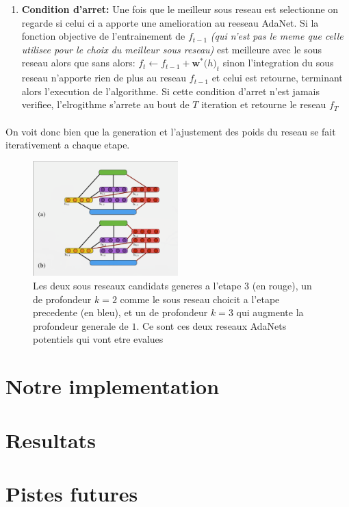 \documentclass[11 pt]{article}
\begin{document}
\begin{enumerate}
	\item \textbf{Condition d'arret: }Une fois que le meilleur sous reseau est selectionne on regarde si celui ci a apporte une amelioration au reeseau AdaNet. Si la fonction objective de l'entrainement de $f_{t-1}$ \emph{(qui n'est pas le meme que celle utilisee pour le choix du meilleur sous reseau)} est meilleure avec le sous reseau alors que sans alors: $f_t \leftarrow f_{t-1}+\mathbf{w}^*\mathbf(h)_t$ sinon l'integration du sous reseau n'apporte rien de plus au reseau $f_{t-1}$ et celui est retourne, terminant alors l'execution de l'algorithme. Si cette condition d'arret n'est jamais verifiee, l'elrogithme s'arrete au bout de $T$ iteration et retourne le reseau $f_T$
\end{enumerate}
\paragraph{}On voit donc bien que la generation et l'ajustement des poids du reseau se fait iterativement a chaque etape.\\ \bigskip
\begin{figure}[h]
	\centering
	\includegraphics[width=0.5\textwidth]{schema.png}
	\caption{Les deux sous reseaux candidats generes a l'etape $3$ (en rouge), un de profondeur $k=2$ comme le sous reseau choicit a l'etape precedente (en bleu), et un de profondeur $k=3$ qui augmente la profondeur generale de $1$. Ce sont ces deux reseaux AdaNets potentiels qui vont etre evalues}
	\label{candidateModels}
\end{figure}



\section{Notre implementation}
\section{Resultats}
\section{Pistes futures}
\end{document}
